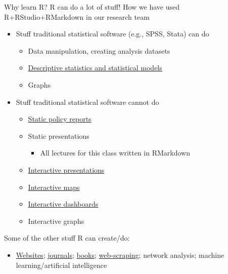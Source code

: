 \documentclass[
  8pt,
  ignorenonframetext,
  dvipsnames]{beamer}
\providecommand{\tightlist}{%
  \setlength{\itemsep}{0pt}\setlength{\parskip}{0pt}}
\let\olditem\item
\renewcommand{\item}{%
  \olditem\vspace{4pt}
}
\begin{document}
\begin{frame}{Why learn R? R can do a lot of stuff!}
\protect\hypertarget{why-learn-r-r-can-do-a-lot-of-stuff}{}
How we have used R+RStudio+RMarkdown in our research team

\begin{itemize}
\tightlist
\item
  Stuff traditional statistical software (e.g., SPSS, Stata) can do

  \begin{itemize}
  \tightlist
  \item
    Data manipulation, creating analysis datasets
  \item
    \href{https://ozanj.github.io/soc_of_ed_presentation/\#/slide-15}{Descriptive
    statistics and statistical models}
  \item
    Graphs
  \end{itemize}
\item
  Stuff traditional statistical software cannot do

  \begin{itemize}
  \tightlist
  \item
    \href{https://emraresearch.org/sites/default/files/2019-03/joyce_report.pdf}{Static
    policy reports}
  \item
    Static presentations

    \begin{itemize}
    \tightlist
    \item
      All lectures for this class written in RMarkdown
    \end{itemize}
  \item
    \href{https://ozanj.github.io/joyce_report/\#/title}{Interactive
    presentations}
  \item
    \href{https://ozanj.github.io/joyce_report/\#/4}{Interactive maps}
  \item
    \href{https://jkcf.shinyapps.io/dashboard/}{Interactive dashboards}
  \item
    Interactive graphs
  \end{itemize}
\end{itemize}

Some of the other stuff R can create/do:

\begin{itemize}
\tightlist
\item
  \href{https://bookdown.org/yihui/rmarkdown/websites.html}{Websites};
  \href{https://bookdown.org/yihui/rmarkdown/journals.html}{journals};
  \href{https://bookdown.org/}{books};
  \href{https://www.analyticsvidhya.com/blog/2017/03/beginners-guide-on-web-scraping-in-r-using-rvest-with-hands-on-knowledge/}{web-scraping};
  network analysis; machine learning/artificial intelligence
\end{itemize}
\end{frame}
\end{document}

